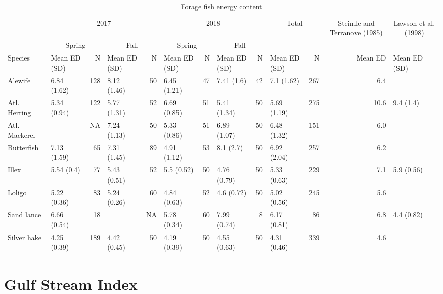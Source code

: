 \documentclass[
]{book}
\begin{document}
\begin{table}

\caption{\label{tab:unnamed-chunk-16}Forage fish energy content}
\centering
\fontsize{9}{11}\selectfont
\begin{tabular}[t]{l|l|r|l|r|l|r|l|r|l|r|r|l}
\hline
\multicolumn{1}{c|}{ } & \multicolumn{4}{c|}{2017} & \multicolumn{4}{c|}{2018} & \multicolumn{2}{c|}{Total} & \multicolumn{1}{c|}{Steimle and Terranove (1985)} & \multicolumn{1}{c}{Lawson et al. (1998)} \\
\cline{2-5} \cline{6-9} \cline{10-11} \cline{12-12} \cline{13-13}
\multicolumn{1}{c|}{ } & \multicolumn{2}{c|}{Spring} & \multicolumn{2}{c|}{Fall} & \multicolumn{2}{c|}{Spring} & \multicolumn{2}{c|}{Fall} & \multicolumn{4}{c}{ } \\
\cline{2-3} \cline{4-5} \cline{6-7} \cline{8-9}
Species & Mean ED (SD) & N & Mean ED (SD) & N & Mean ED (SD) & N & Mean ED (SD) & N & Mean ED (SD) & N & Mean ED & Mean ED (SD)\\
\hline
Alewife & 6.84 (1.62) & 128 & 8.12 (1.46) & 50 & 6.45 (1.21) & 47 & 7.41 (1.6) & 42 & 7.1 (1.62) & 267 & 6.4 & \\
\hline
Atl. Herring & 5.34 (0.94) & 122 & 5.77 (1.31) & 52 & 6.69 (0.85) & 51 & 5.41 (1.34) & 50 & 5.69 (1.19) & 275 & 10.6 & 9.4 (1.4)\\
\hline
Atl. Mackerel &  & NA & 7.24 (1.13) & 50 & 5.33 (0.86) & 51 & 6.89 (1.07) & 50 & 6.48 (1.32) & 151 & 6.0 & \\
\hline
Butterfish & 7.13 (1.59) & 65 & 7.31 (1.45) & 89 & 4.91 (1.12) & 53 & 8.1 (2.7) & 50 & 6.92 (2.04) & 257 & 6.2 & \\
\hline
Illex & 5.54 (0.4) & 77 & 5.43 (0.51) & 52 & 5.5 (0.52) & 50 & 4.76 (0.79) & 50 & 5.33 (0.63) & 229 & 7.1 & 5.9 (0.56)\\
\hline
Loligo & 5.22 (0.36) & 83 & 5.24 (0.26) & 60 & 4.84 (0.63) & 52 & 4.6 (0.72) & 50 & 5.02 (0.56) & 245 & 5.6 & \\
\hline
Sand lance & 6.66 (0.54) & 18 &  & NA & 5.78 (0.34) & 60 & 7.99 (0.74) & 8 & 6.17 (0.81) & 86 & 6.8 & 4.4 (0.82)\\
\hline
Silver hake & 4.25 (0.39) & 189 & 4.42 (0.45) & 50 & 4.19 (0.39) & 50 & 4.55 (0.63) & 50 & 4.31 (0.46) & 339 & 4.6 & \\
\hline
\end{tabular}
\end{table}

\hypertarget{gulf-stream-index}{%
\chapter{Gulf Stream Index}\label{gulf-stream-index}}
\end{document}
